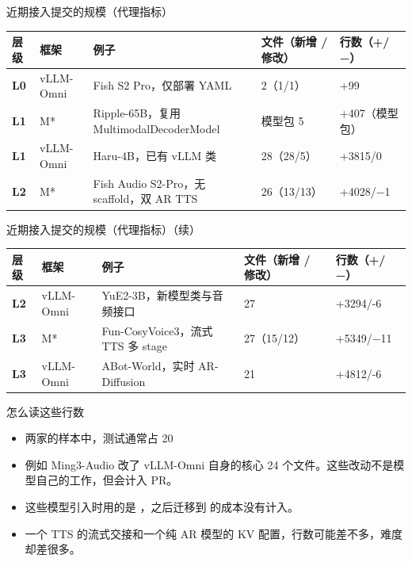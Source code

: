 \begin{frame}[t]{近期接入提交的规模（代理指标）}
\scriptsize\def\codesize{\relax}
\renewcommand{\arraystretch}{1.12}
\setlength{\tabcolsep}{3pt}
\begin{tabularx}{\textwidth}{>{\bfseries}p{1.2cm} p{1.2cm} Y Y Y}
\toprule
{}
层级 & 框架 & 例子 & 文件（新增 / 修改） & 行数（+/−） \\
\midrule
L0 & vLLM-Omni & Fish S2 Pro，仅部署 YAML & 2（1/1） & +99 \\
L1 & M* & Ripple-65B，复用 MultimodalDecoderModel & 模型包 5 & +407（模型包） \\
L1 & vLLM-Omni & Haru-4B，已有 vLLM 类 & 28（28/5） & +3815/0 \\
L2 & M* & Fish Audio S2-Pro，无 scaffold，双 AR TTS & 26（13/13） & +4028/−1 \\
\bottomrule
\end{tabularx}
\vspace{6pt}
\end{frame}
\begin{frame}[t]{近期接入提交的规模（代理指标）（续）}
\scriptsize\def\codesize{\relax}
\renewcommand{\arraystretch}{1.12}
\setlength{\tabcolsep}{3pt}
\begin{tabularx}{\textwidth}{>{\bfseries}p{1.2cm} p{1.2cm} Y Y Y}
\toprule
{}
层级 & 框架 & 例子 & 文件（新增 / 修改） & 行数（+/−） \\
\midrule
L2 & vLLM-Omni & YuE2-3B，新模型类与音频接口 & 27 & +3294/-6 \\
L3 & M* & Fun-CosyVoice3，流式 TTS 多 stage & 27（15/12） & +5349/−11 \\
L3 & vLLM-Omni & ABot-World，实时 AR-Diffusion & 21 & +4812/-6 \\
\bottomrule
\end{tabularx}
\vspace{1pt}
\end{frame}

\begin{frame}[t]{怎么读这些行数}
\small
\begin{itemize}
  \item {}两家的样本中，测试通常占 20%
  \item {}例如 Ming3-Audio 改了 vLLM-Omni 自身的核心 24 个文件。这些改动不是模型自己的工作，但会计入 PR。
  \item {}这些模型引入时用的是 ，之后迁移到  的成本没有计入。
  \item {}一个 TTS 的流式交接和一个纯 AR 模型的 KV 配置，行数可能差不多，难度却差很多。
\end{itemize}
\end{frame}

